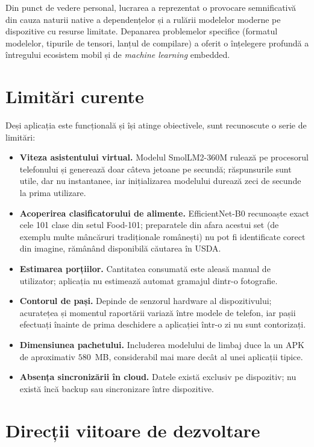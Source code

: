 \documentclass[12pt, a4paper, twoside]{report}
\numberwithin{equation}{section}
\begin{document}
Din punct de vedere personal, lucrarea a reprezentat o provocare semnificativă din cauza
naturii native a dependențelor și a rulării modelelor moderne pe dispozitive cu resurse
limitate. Depanarea problemelor specifice (formatul modelelor, tipurile de tensori, lanțul de
compilare) a oferit o înțelegere profundă a întregului ecosistem mobil și de \textit{machine
learning} embedded.

\section{Limitări curente}

Deși aplicația este funcțională și își atinge obiectivele, sunt recunoscute o serie de limitări:

\begin{itemize}
  \item \textbf{Viteza asistentului virtual.} Modelul SmolLM2-360M rulează pe procesorul
    telefonului și generează doar câteva jetoane pe secundă; răspunsurile sunt utile, dar nu
    instantanee, iar inițializarea modelului durează zeci de secunde la prima utilizare.
  \item \textbf{Acoperirea clasificatorului de alimente.} EfficientNet-B0 recunoaște exact cele
    101 clase din setul Food-101; preparatele din afara acestui set (de exemplu multe mâncăruri
    tradiționale românești) nu pot fi identificate corect din imagine, rămânând disponibilă
    căutarea în USDA.
  \item \textbf{Estimarea porțiilor.} Cantitatea consumată este aleasă manual de utilizator;
    aplicația nu estimează automat gramajul dintr-o fotografie.
  \item \textbf{Contorul de pași.} Depinde de senzorul hardware al dispozitivului; acuratețea
    și momentul raportării variază între modele de telefon, iar pașii efectuați înainte de
    prima deschidere a aplicației într-o zi nu sunt contorizați.
  \item \textbf{Dimensiunea pachetului.} Includerea modelului de limbaj duce la un APK de
    aproximativ $580$~MB, considerabil mai mare decât al unei aplicații tipice.
  \item \textbf{Absența sincronizării în cloud.} Datele există exclusiv pe dispozitiv; nu
    există încă backup sau sincronizare între dispozitive.
\end{itemize}

\section{Direcții viitoare de dezvoltare}
\end{document}
